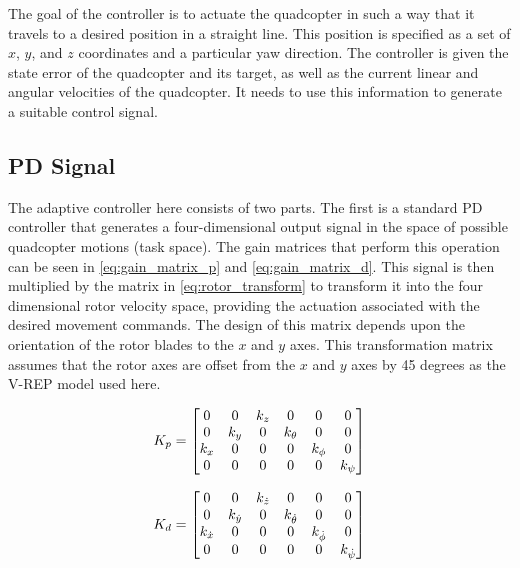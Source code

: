 \documentclass[letterpaper, 10 pt, conference]{ieeeconf}  %
\begin{document}
The goal of the controller is to actuate the quadcopter in such a way that it travels to a desired position in a straight line. 
This position is specified as a set of $x$, $y$, and $z$ coordinates and a particular yaw direction. 
The controller is given the state error of the quadcopter and its target, as well as the current linear and angular velocities of the quadcopter. 
It needs to use this information to generate a suitable control signal.

\subsection{PD Signal}

The adaptive controller here consists of two parts. The first is a standard PD controller that generates a four-dimensional output signal in the space of possible quadcopter motions (task space). 
The gain matrices that perform this operation can be seen in \eqref{eq:gain_matrix_p} and \eqref{eq:gain_matrix_d}. 
This signal is then multiplied by the matrix in \eqref{eq:rotor_transform} to transform it into the four dimensional rotor velocity space, providing the actuation associated with the desired movement commands.
The design of this matrix depends upon the orientation of the rotor blades to the $x$ and $y$ axes. 
This transformation matrix assumes that the rotor axes are offset from the $x$ and $y$ axes by 45 degrees as the V-REP model used here.

\begin{equation} \label{eq:gain_matrix_p}
K_{p} =
\setcounter{MaxMatrixCols}{12}
\begin{bmatrix}
0 & 0 & k_{z} & 0 & 0 & 0 \\
0 & k_{y} & 0 & k_{\theta} & 0 & 0\\
k_{x} & 0 & 0 & 0 & k_{\phi} & 0 \\
0 & 0 & 0 & 0 & 0 & k_{\psi}
\end{bmatrix}
\end{equation}

\begin{equation} \label{eq:gain_matrix_d}
K_{d} =
\setcounter{MaxMatrixCols}{12}
\begin{bmatrix}
0 & 0 & k_{\dot{z}} & 0 & 0 & 0 \\
0 & k_{\dot{y}} & 0 & k_{\dot{\theta}} & 0 & 0\\
k_{\dot{x}} & 0 & 0 & 0 & k_{\dot{\phi}} & 0 \\
0 & 0 & 0 & 0 & 0 & k_{\dot{\psi}}
\end{bmatrix}
\end{equation}
\end{document}
